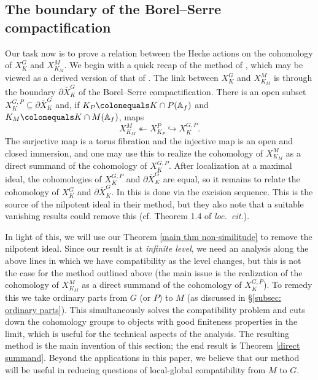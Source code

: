 \documentclass{amsart}
\theoremstyle{remark}
\numberwithin{equation}{subsection}
\newcommand{\A}{\AA}
\renewcommand{\AA}{{\mathbb A}}
\newcommand{\ol}{\overline}
\newcommand{\sub}{\subseteq}
\newcommand{\defeq}{\colonequals}
\renewcommand{\(}{\left(}
\renewcommand{\)}{\right)}
\begin{document}
\subsection{The boundary of the Borel--Serre compactification}\label{subsec: boundary}

Our task now is to prove a relation between the Hecke actions on the cohomology of $X^G_K$ and $X_{K_M}^M$. We begin with a quick recap of the method of \cite{newton-thorne}, which may be viewed as a derived version of that of \cite{scholze-galois}. The link between $X^G_K$ and $X_{K_M}^M$ is through the boundary $\partial \ol{X}^G_K$ of the Borel--Serre compactification. There is an open subset $X_K^{G,P} \sub \partial \ol{X}_K^G$ and, if $K_P \defeq K \cap P(\A_f)$ and $K_M \defeq K \cap M(\A_f)$, maps
\[
 X_{K_M}^M \twoheadleftarrow X_{K_P}^P \hookrightarrow X_K^{G,P}.
\]
The surjective map is a torus fibration and the injective map is an open and closed immersion, and one may use this to realize the cohomology of  $X_{K_M}^M$ as a direct summand of the cohomology of $X_K^{G,P}$. After localization at a maximal ideal, the cohomologies of $X_K^{G,P}$ and $\partial \ol{X}_K^G$ are equal, so it remains  to relate the cohomology of $X_K^{G}$ and $\partial \ol{X}_K^G$. In \cite{newton-thorne} this is done via the excision sequence. This is the source of the nilpotent ideal in their method, but they also note that a suitable vanishing results could remove this (cf. Theorem 1.4 of \emph{loc.\ cit.}).

\medskip

In light of this, we will use our Theorem \ref{main thm non-similitude} to remove the nilpotent ideal. Since our result is at \emph{infinite level}, we need an analysis along the above lines in which we have compatibility as the level changes, but this is not the case for the method outlined above (the main issue is the realization of the cohomology of  $X_{K_M}^M$ as a direct summand of the cohomology of $X_K^{G,P}$). To remedy this we take ordinary parts from $G$ (or $P$) to $M$ (as discussed in \S \ref{subsec: ordinary parts}). This simultaneously solves the compatibility problem and cuts down the cohomology groups to objects with good finiteness properties in the limit, which is useful for the technical aspects of the analysis. The resulting method is the main invention of this section; the end result is Theorem \ref{direct summand}. Beyond the applications in this paper, we believe that our method will be useful in reducing questions of local-global compatibility from $M$ to $G$. 
\end{document}
